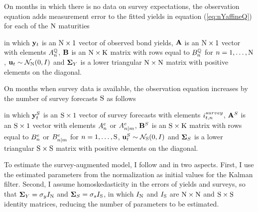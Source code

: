 {On months in which there is no data on survey expectations, the observation equation adds measurement error to the fitted yields in equation (\ref{eq:nYaffineQ}) for each of the \(\mathrm{N}\) maturities
	
\noindent in which \(\mathbf{y}_{t}\) is an \(\mathrm{N} \times 1\) vector of observed bond yields, \(\mathbf{A}\) is an \(\mathrm{N} \times 1\) vector with elements \(A_{n}^{\mathbb{Q}}\), \(\mathbf{B}\) is an \(\mathrm{N} \times \mathrm{K}\) matrix with rows equal to \(B_{n}^{\mathbb{Q}}\) for \(n = 1, \ldots, \mathrm{N}\), \(\mathbf{u}_{t} \sim \mathcal{N}_{\mathrm{N}} (0,I) \) and \(\mathbf{\mathbf{\Sigma}}_{Y}\) is a lower triangular \(\mathrm{N} \times \mathrm{N}\) matrix with positive elements on the diagonal.

On months when survey data is available, the observation equation increases by the number of survey forecasts \(\mathrm{S}\) as follows
	
\noindent in which \(\mathbf{y}_{t}^{S}\) is an \(\mathrm{S} \times 1\) vector of survey forecasts with elements \(i_{t,n}^{survey}\), \(\mathbf{A}^{S}\) is an \(\mathrm{S} \times 1\) vector with elements \(A_{n}^{e}\) or \(A_{n | m}^{e}\), \(\mathbf{B}^{S}\) is an \(\mathrm{S} \times \mathrm{K}\) matrix with rows equal to \(B_{n}^{e}\) or \(B_{n | m}^{e}\) for \(n = 1, \ldots, \mathrm{S}\), \(\mathbf{u}_{t}^{S} \sim \mathcal{N}_{\mathrm{S}} (0,I) \) and \(\mathbf{\mathbf{\Sigma}}_{S}\) is a lower triangular \(\mathrm{S} \times \mathrm{S}\) matrix with positive elements on the diagonal.

To estimate the survey-augmented model, I follow \cite{Guimaraes:2014} and \cite{Lloyd:2020} in two aspects. First, I use the estimated parameters from the \cite{JSZ:2011} normalization as initial values for the Kalman filter.
Second, I assume homoskedasticity in the errors of yields and surveys, so that \(\mathbf{\mathbf{\Sigma}}_{Y} = \sigma_y I_{\mathrm{N}}\) and \(\mathbf{\mathbf{\Sigma}}_{S} = \sigma_s I_{\mathrm{S}}\), in which \(I_{\mathrm{N}}\) and \(I_{\mathrm{S}}\) are \(\mathrm{N} \times \mathrm{N}\) and \(\mathrm{S} \times \mathrm{S}\) identity matrices, %
reducing the number of parameters to be estimated.

}

